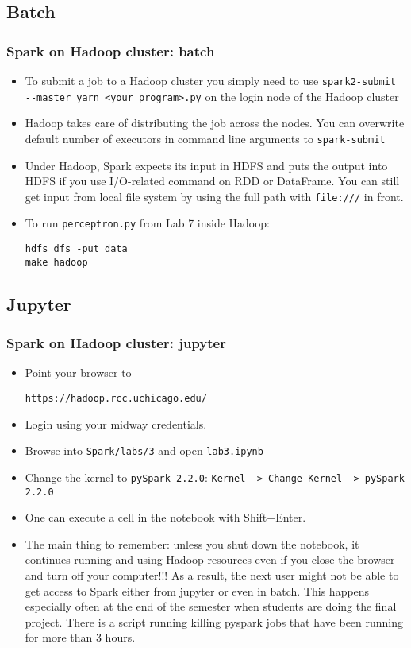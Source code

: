 \documentclass{beamer}
\begin{document}
\begin{frame}[fragile]
\begin{itemize}
\subsection{Batch}
\begin{frame}[fragile]
  \frametitle{Spark on Hadoop cluster: batch}
  \begin{itemize}
  \item To submit a job to a Hadoop cluster you simply need to use 
    {\color{mycolorcli}\verb|spark2-submit --master yarn <your program>.py|} on
    the login node of the Hadoop cluster
  \item Hadoop takes care of distributing the job across the nodes. You can overwrite default number of executors
    in command line arguments to {\color{mycolorcli}\verb|spark-submit|}
  \item Under Hadoop, Spark expects its input in HDFS and puts the output into HDFS
    if you use I/O-related command on RDD or DataFrame. You can still get input from local file system
    by using the full path with {\color{mycolorcli}\verb|file:///|} in front.
  \item To run {\color{mycolorcli}\verb|perceptron.py|} from Lab 7 inside Hadoop:
    {\color{mycolorcli}
\begin{verbatim}
hdfs dfs -put data
make hadoop
\end{verbatim}
    }
  \end{itemize}
\end{frame}

\subsection{Jupyter}
\begin{frame}[fragile]
  \frametitle{Spark on Hadoop cluster: jupyter}
\begin{itemize}
\item Point your browser to
{\color{mycolorcli}
\begin{verbatim}
https://hadoop.rcc.uchicago.edu/
\end{verbatim}
}
\item Login using your midway credentials.
\item Browse into {\color{mycolorcli}\verb|Spark/labs/3|} and open {\color{mycolorcli}\verb|lab3.ipynb|}
\item Change the kernel to {\color{mycolorcli}\verb|pySpark 2.2.0|}: \verb|Kernel -> Change Kernel -> pySpark 2.2.0|
\item One can execute a cell in the notebook with Shift+Enter.
\item The main thing to remember: unless you shut down the notebook, it continues running and using Hadoop resources even if you
  close the browser and turn off your computer!!! As a result, the next user might not be able to get access to Spark either
  from jupyter or even in batch. This happens especially often at the end of the semester when students are doing the final project.
  There is a script running killing pyspark jobs that have been running for more than 3 hours.
\end{itemize}
\end{frame}


\end{itemize}
\end{frame}
\end{document}
